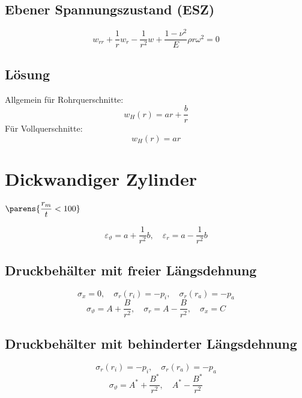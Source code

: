 	\subsection{Ebener Spannungszustand (ESZ)} %
		\begin{equation*}
			w_{rr} + \frac{1}{r}w_r - \frac{1}{r^2}w + \frac{1-\nu^2}{E}\rho r \omega^2=0
		\end{equation*}
	\subsection{Lösung} %
		Allgemein für Rohrquerschnitte:
		\begin{equation*}
			w_H(r) = ar + \frac{b}{r}
		\end{equation*}
		Für Vollquerschnitte:
		\begin{equation*}
			w_H(r) = ar
		\end{equation*}
\section{Dickwandiger Zylinder} %
	\begin{flushright}
		\vspace{-1cm}
		$\displaystyle\parens{\frac{r_m}{t} < 100}$
		\vspace{0cm}
	\end{flushright}
	\begin{equation*}
		\varepsilon_\vartheta = a + \frac{1}{r^2}b, \quad \varepsilon_r = a - \frac{1}{r^2}b
	\end{equation*}
	
	\subsection{Druckbehälter mit freier Längsdehnung} %
		\begin{equation*}
			\sigma_x = 0, \quad \sigma_r (r_i) = - p_i, \quad \sigma_r (r_a) = - p_a
		\end{equation*}
		\begin{equation*}
			\sigma_\vartheta = A + \frac{B}{r^2}, \quad \sigma_r = A - \frac{B}{r^2}, \quad \sigma_x = C
		\end{equation*}
	\subsection{Druckbehälter mit behinderter Längsdehnung} %
		\begin{equation*}
			\sigma_r (r_i) = - p_i, \quad \sigma_r (r_a) = - p_a
		\end{equation*}
		\begin{equation*}
			\sigma_\vartheta = A^* + \frac{B^*}{r^2}, \quad A^* - \frac{B^*}{r^2}
		\end{equation*}
